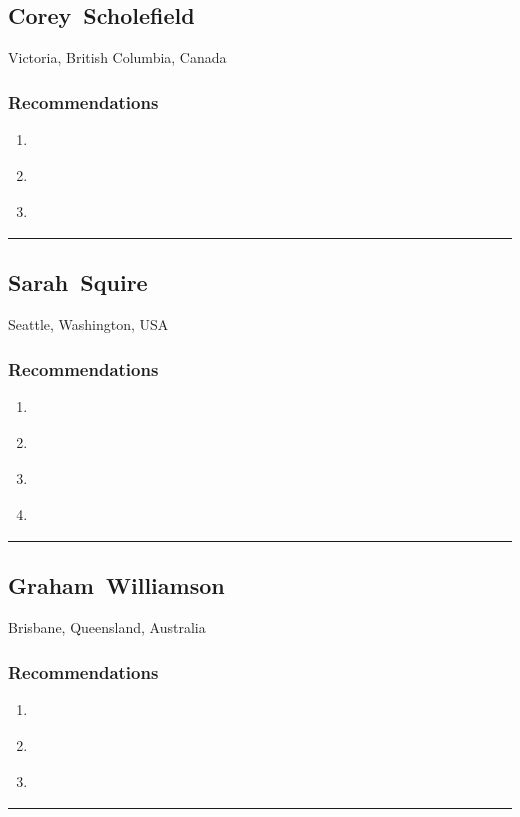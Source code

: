 \subsection{Corey~Scholefield} \textsf{Victoria, British Columbia, Canada} \smallskip {} \sffamily  \medskip \subsubsection{Recommendations}\begin{enumerate}
\item \cite{Hazelton2015}
\item \cite{Prasad2012}
\item \cite{Windley2005}
\end{enumerate}\noindent\rule{\textwidth}{0.2pt}

\subsection{Sarah~Squire} \textsf{Seattle, Washington, USA} \smallskip {} \sffamily  \medskip \subsubsection{Recommendations}\begin{enumerate}
\item \cite{Gilman2017}
\item \cite{Hardt2005}
\item \cite{NSTIC2011}
\item \cite{Richer2017}
\end{enumerate}\noindent\rule{\textwidth}{0.2pt}

\subsection{Graham~Williamson} \textsf{Brisbane, Queensland, Australia} \smallskip {} \sffamily  \medskip \subsubsection{Recommendations}\begin{enumerate}
\item \cite{DTA-AUS2018}
\item \cite{NIST-USA2017}
\item \cite{Williamson2017}
\end{enumerate}\noindent\rule{\textwidth}{0.2pt}

